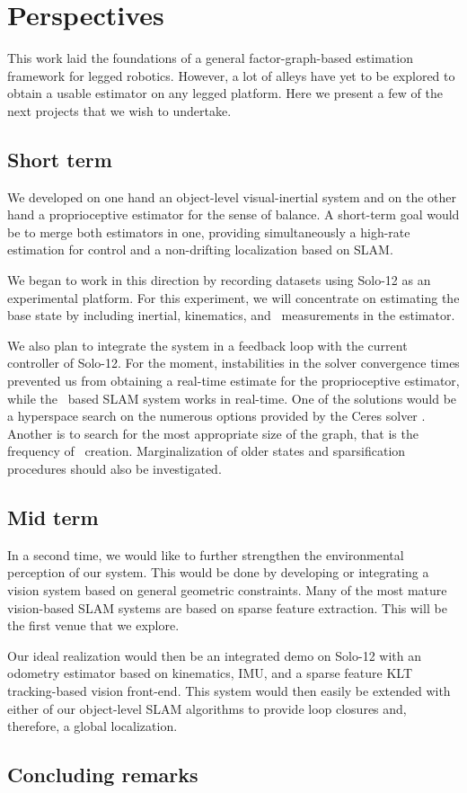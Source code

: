 \section{Perspectives}
This work laid the foundations of a general factor-graph-based estimation framework for legged robotics. However, a lot of alleys have yet to be explored 
to obtain a usable estimator on any legged platform. Here we present a few of the next projects that we wish to undertake.

\subsection{Short term}
We developed on one hand an object-level visual-inertial system and on the other hand a proprioceptive estimator for the sense of balance. A short-term goal
would be to merge both estimators in one, providing simultaneously a high-rate estimation for control and a non-drifting localization based on SLAM. 

We began to work in this direction by recording datasets using Solo-12 as an experimental platform. For this experiment, we will concentrate on estimating the 
base state by including inertial, kinematics, and \apriltag\ measurements in the estimator. 

We also plan to integrate the system in a feedback loop with the current controller of Solo-12. For the moment, instabilities in the solver convergence times prevented
us from obtaining a real-time estimate for the proprioceptive estimator, while the \apriltag\ based SLAM system works in real-time. One of the solutions would 
be a hyperspace search on the numerous options provided by the Ceres solver \cite{ceres-solver}. Another is to search for the most appropriate size of the graph,
that is the frequency of \keyframe\ creation. Marginalization of older states and sparsification procedures should also be investigated.

\subsection{Mid term}

In a second time, we would like to further strengthen the environmental perception of our system. This would be done by developing or integrating a vision system
based on general geometric constraints. Many of the most mature vision-based SLAM systems are based on sparse feature extraction. This will be 
the first venue that we explore. 

Our ideal realization would then be an integrated demo on Solo-12 with an odometry estimator based on kinematics, IMU, and a sparse feature KLT tracking-based 
vision front-end. This system would then easily be extended with either of our object-level SLAM algorithms to provide loop closures and, therefore, a global localization.

\subsection{Concluding remarks}


